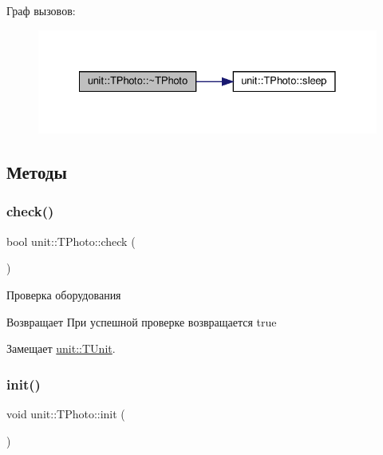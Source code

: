  Граф вызовов\+:\nopagebreak
\begin{figure}[H]
\begin{center}
\leavevmode
\includegraphics[width=328pt]{classunit_1_1_t_photo_a1c9c83e03a16b4e66a0fc48f734a5b93_cgraph}
\end{center}
\end{figure}


\subsection{Методы}
\mbox{\label{classunit_1_1_t_photo_a292ed1d6e9fb0b8335234891716eec8d}} 
\subsubsection{\texorpdfstring{check()}{check()}}
{\footnotesize\ttfamily bool unit\+::\+T\+Photo\+::check (\begin{DoxyParamCaption}{ }\end{DoxyParamCaption})\hspace{0.3cm}{\ttfamily [virtual]}}



Проверка оборудования 





\begin{DoxyReturn}{Возвращает}
При успешной проверке возвращается true 
\end{DoxyReturn}


Замещает \hyperlink{classunit_1_1_t_unit_abdcc6daabc86cea10abc96593d9d2c2a}{unit\+::\+T\+Unit}.

\mbox{\label{classunit_1_1_t_photo_adfad75bd5d77ef72f526cc43474c3d87}} 
\subsubsection{\texorpdfstring{init()}{init()}}
{\footnotesize\ttfamily void unit\+::\+T\+Photo\+::init (\begin{DoxyParamCaption}{ }\end{DoxyParamCaption})\hspace{0.3cm}{\ttfamily [virtual]}}



